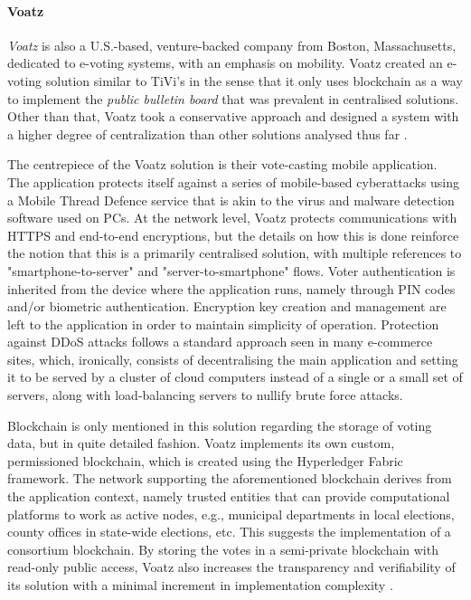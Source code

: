 \documentclass[../access.tex]{subfiles}
\begin{document}
	\paragraph{Voatz \cite{Voatz2021}}
        \textit{Voatz} is also a U.S.-based, venture-backed company from Boston, Massachusetts, dedicated to e-voting systems, with an emphasis on mobility. Voatz created an e-voting solution similar to TiVi's in the sense that it only uses blockchain as a way to implement the \textit{public bulletin board} that was prevalent in centralised solutions. Other than that, Voatz took a conservative approach and designed a system with a higher degree of centralization than other solutions analysed thus far \cite{Voatz2021}.
		\par
        The centrepiece of the Voatz solution is their vote-casting mobile application. The application protects itself against a series of mobile-based cyberattacks using a Mobile Thread Defence service that is akin to the virus and malware detection software used on PCs. At the network level, Voatz protects communications with HTTPS and end-to-end encryptions, but the details on how this is done reinforce the notion that this is a primarily centralised solution, with multiple references to "smartphone-to-server" and "server-to-smartphone" flows. Voter authentication is inherited from the device where the application runs, namely through PIN codes and/or biometric authentication. Encryption key creation and management are left to the application in order to maintain simplicity of operation. Protection against DDoS attacks follows a standard approach seen in many e-commerce sites, which, ironically, consists of decentralising the main application and setting it to be served by a cluster of cloud computers instead of a single or a small set of servers, along with load-balancing servers to nullify brute force attacks.
		\par
        Blockchain is only mentioned in this solution regarding the storage of voting data, but in quite detailed fashion. Voatz implements its own custom, permissioned blockchain, which is created using the Hyperledger Fabric framework. The network supporting the aforementioned blockchain derives from the application context, namely trusted entities that can provide computational platforms to work as active nodes, e.g., municipal departments in local elections, county offices in state-wide elections, etc. This suggests the implementation of a consortium blockchain. By storing the votes in a semi-private blockchain with read-only public access, Voatz also increases the transparency and verifiability of its solution with a minimal increment in implementation complexity \cite{Moore2019}.
\end{document}
